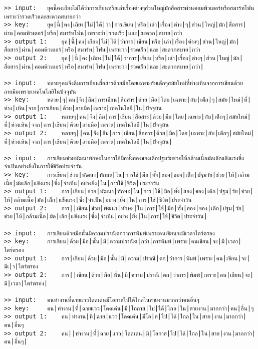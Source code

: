 \documentclass[11pt]{article}
\begin{document}
\begin{Verbatim}[commandchars=\\\{\}]
>> input:	ยุคนี้คงเถียงไม่ได้ว่าการเขียนหรือเล่าเรื่องต่างๆส่วนใหญ่มักสื่อสารผ่านคอมพิวเตอร์หรือสมาร์ทโฟนเพราะว่ารวดเร็วและสะดวกสบายกว่า
>> key:		ยุค|นี้|คง|เถียง|ไม่|ได้|ว่า|การเขียน|หรือ|เล่า|เรื่อง|ต่าง|ๆ|ส่วน|ใหญ่|มัก|สื่อสาร|ผ่าน|คอมพิวเตอร์|หรือ|สมาร์ทโฟน|เพราะว่า|รวดเร็ว|และ|สะดวก|สบาย|กว่า
>> output 1:	ยุค|นี้|คง|เถียง|ไม่|ได้|ว่าการ|เขียน|หรือ|เล่า|เรื่อง|ต่างๆ|ส่วน|ใหญ่|มัก|สื่อสาร|ผ่าน|คอมพิวเตอร์|หรือ|สมาร์ท|โฟน|เพราะว่า|รวดเร็ว|และ|สะดวกสบาย|กว่า
>> output 2:	ยุค||นี้|คง|เถียง|ไม่|ได้|ว่าการ|เขียน|หรือ|เล่า|เรื่อง|ต่างๆ|ส่วน|ใหญ่|มัก|สื่อสาร|ผ่าน|คอมพิวเตอร์|หรือ|สมาร์ท|โฟน|เพราะว่า|รวดเร็ว|และ|สะดวกสบาย|กว่า|

>> input:	หลายๆคนจึงลืมการเขียนสื่อสารด้วยมือโดยเฉพาะกับเด็กๆสมัยใหม่ที่ห่างเหินจากการเขียนด้วยลายมือเพราะเทคโนโลยีในปัจจุบัน
>> key:		หลาย|ๆ|คน|จึง|ลืม|การเขียน|สื่อสาร|ด้วย|มือ|โดย|เฉพาะ|กับ|เด็ก|ๆ|สมัย|ใหม่|ที่|ห่าง|เหิน|จาก|การเขียน|ด้วย|ลายมือ|เพราะ|เทคโนโลยี|ใน|ปัจจุบัน
>> output 1:	หลายๆ|คน|จึง|ลืม|การ|เขียน|สื่อสาร|ด้วย|มือ|โดย|เฉพาะ|กับ|เด็กๆ|สมัยใหม่|ที่|ห่างเหิน|จาก|การ|เขียน|ด้วย|ลายมือ|เพราะ|เทคโนโลยี|ใน|ปัจจุบัน
>> output 2:	หลายๆ||คน|จึง|ลืม|การ|เขียน|สื่อสาร|ด้วย|มือ|โดย|เฉพาะ|กับ|เด็กๆ|สมัยใหม่|ที่|ห่างเหิน|จาก|การ|เขียน|ด้วย|ลายมือ|เพราะ|เทคโนโลยี|ใน|ปัจจุบัน|

>> input:	การเขียนช่วยพัฒนาทักษะในการใช้มือทั้งสองของเด็กปฐมวัยช่วยให้กล้ามเนื้อมัดเล็กแข็งแรงซึ่งจำเป็นอย่างยิ่งในการใช้ชีวิตประจำวัน
>> key:		การเขียน|ช่วย|พัฒนา|ทักษะ|ใน|การใช้|มือ|ทั้ง|สอง|ของ|เด็ก|ปฐมวัย|ช่วย|ให้|กล้ามเนื้อ|มัดเล็ก|แข็งแรง|ซึ่ง|จำเป็น|อย่างยิ่ง|ใน|การใช้|ชีวิต|ประจำวัน
>> output 1:	การ|เขียน|ช่วย|พัฒนา|ทักษะ|ใน|การ|ใช้|มือ|ทั้ง|สอง|ของ|เด็ก|ปฐม|วัย|ช่วย|ให้|กล้ามเนื้อ|มัด|เล็ก|แข็งแรง|ซึ่ง|จำเป็น|อย่าง|ยิ่ง|ใน|การ|ใช้|ชีวิต|ประจำวัน
>> output 2:	การ||เขียน|ช่วย|พัฒนา|ทักษะ|ใน|การ|ใช้|มือ|ทั้ง|สอง|ของ|เด็ก|ปฐม|วัย|ช่วย|ให้|กล้ามเนื้อ|มัด|เล็ก|แข็งแรง|ซึ่ง|จำเป็น|อย่าง|ยิ่ง|ใน|การ|ใช้|ชีวิต|ประจำวัน|

>> input:	การเขียนด้วยมือนั้นมีความปราณีตกว่าการพิมพ์เพราะคนเขียนจะมีเวลาไตร่ตรอง
>> key:		การเขียน|ด้วย|มือ|นั้น|มี|ความปราณีต|กว่า|การพิมพ์|เพราะ|คนเขียน|จะ|มี|เวลา|ไตร่ตรอง
>> output 1:	การ|เขียน|ด้วย|มือ|นั้น|มี|ความ|ปราณี|ตก|ว่าการ|พิมพ์|เพราะ|คน|เขียน|จะ|มีเ|า|ไตร่ตรอง
>> output 2:	การ||เขียน|ด้วย|มือ|นั้น|มี|ความ|ปราณี|ตก|ว่าการ|พิมพ์|เพราะ|คน|เขียน|จะ|มี|เวลา|ไตร่ตรอง|

>> input:	คนทำงานที่ฉายแววโดดเด่นมีโอกาสไปได้ไกลในสายงานมากกว่าคนอื่นๆ
>> key:		คน|ทำงาน|ที่|ฉายแวว|โดดเด่น|มี|โอกาส|ไป|ได้|ไกล|ใน|สายงาน|มากกว่า|คน|อื่น|ๆ
>> output 1:	คน|ทำงาน|ที่|ฉาย|แวว|โดดเด่น|มีโอ|ส|ไป|ได้|ไกล|ใน|สาย|งาน|มากกว่า|คน|อื่นๆ
>> output 2:	คน||ทำงาน|ที่|ฉาย|แวว|โดดเด่น|มี|โอกาส|ไป|ได้|ไกล|ใน|สาย|งาน|มากกว่า|คน|อื่นๆ|


\end{Verbatim}
\end{document}

